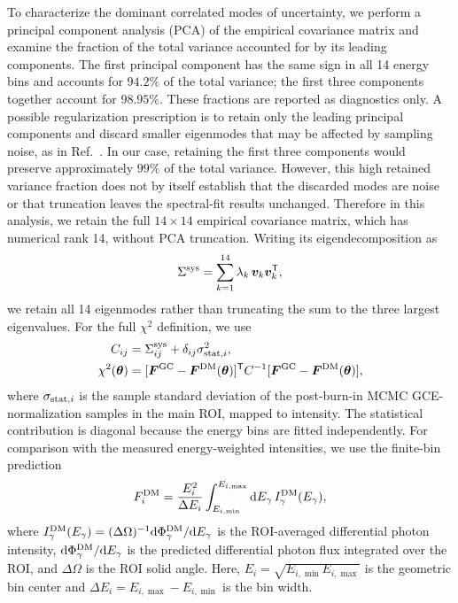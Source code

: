 \documentclass[superscriptaddress,
showpacs,preprintnumbers,nofootinbib,eqsecnum,amsmath,amssymb,aps,11pt, groupedaddress, floatfix]{revtex4-2}
\begin{document}
To characterize the dominant correlated modes of uncertainty, we perform a principal component analysis (PCA) of the empirical covariance matrix and examine the fraction of the total variance accounted for by its leading components.
The first principal component has the same sign in all 14 energy bins and accounts for $94.2\%$ of the total variance; the first three components together account for $98.95\%$. These fractions are reported as diagnostics only.
A possible regularization prescription is to retain only the leading principal components and discard smaller eigenmodes that may be affected by sampling noise, as in Ref.~\cite{Cholis:2021rpp}.
In our case, retaining the first three components would preserve approximately $99\%$ of the total variance. However, this high retained variance fraction does not by itself establish that the discarded modes are noise or that truncation leaves the spectral-fit results unchanged. Therefore in this analysis, we retain the full $14\times14$ empirical covariance matrix, which has numerical rank 14, without PCA truncation. 
Writing its eigendecomposition as
\begin{align}
\Sigma^{\rm sys}
 = \sum_{k=1}^{14}\lambda_k\,\boldsymbol{v}_k\boldsymbol{v}_k^{\mathsf T},
\end{align}
we retain all 14 eigenmodes rather than truncating the sum to the
three largest eigenvalues.
For the full $\chi^2$ definition, we use
\begin{align}
C_{ij} &= \Sigma^{\rm sys}_{ij}
          +\delta_{ij}\sigma_{{\rm stat},i}^{2},\\
\chi^2(\boldsymbol{\theta})
 &= [\boldsymbol{F}^{\rm GC}-\boldsymbol{F}^{\rm DM}(\boldsymbol{\theta})]^{\mathsf T}
    C^{-1}
    [\boldsymbol{F}^{\rm GC}-\boldsymbol{F}^{\rm DM}(\boldsymbol{\theta})],
\end{align}
where $\sigma_{{\rm stat},i}$ is the sample standard deviation of
the post-burn-in MCMC GCE-normalization samples in the main ROI, mapped to intensity. The statistical contribution is diagonal because the energy bins are fitted independently. For comparison with the measured energy-weighted intensities, we use the finite-bin prediction
\begin{equation}
F_i^{\rm DM}
=
\frac{E_i^2}{\Delta E_i}
\int_{E_{i,\min}}^{E_{i,\max}}
\mathrm{d}E_\gamma\,I_\gamma^{\rm DM}(E_\gamma),
\end{equation}
where
$I_\gamma^{\rm DM}(E_\gamma)
=(\Delta\Omega)^{-1}
\mathrm{d}\Phi_\gamma^{\rm DM}/\mathrm{d}E_\gamma$
is the ROI-averaged differential photon intensity,
$\mathrm{d}\Phi_\gamma^{\rm DM}/\mathrm{d}E_\gamma$
is the predicted differential photon flux integrated over the ROI,
and $\Delta\Omega$ is the ROI solid angle.
Here, $E_i=\sqrt{E_{i,\min}E_{i,\max}}$ is the geometric bin center
and $\Delta E_i=E_{i,\max}-E_{i,\min}$ is the bin width.
\end{document}
